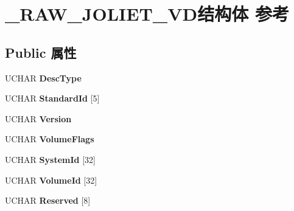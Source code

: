 \hypertarget{struct___r_a_w___j_o_l_i_e_t___v_d}{}\section{\+\_\+\+R\+A\+W\+\_\+\+J\+O\+L\+I\+E\+T\+\_\+\+V\+D结构体 参考}
\label{struct___r_a_w___j_o_l_i_e_t___v_d}
\subsection*{Public 属性}
\begin{DoxyCompactItemize}
\item 
\mbox{\label{struct___r_a_w___j_o_l_i_e_t___v_d_a44002d51a029bf042987a803df643923}} 
U\+C\+H\+AR {\bfseries Desc\+Type}
\item 
\mbox{\label{struct___r_a_w___j_o_l_i_e_t___v_d_ae21f5d4b1b666ac4437ecc6f81cd67c8}} 
U\+C\+H\+AR {\bfseries Standard\+Id} \mbox{[}5\mbox{]}
\item 
\mbox{\label{struct___r_a_w___j_o_l_i_e_t___v_d_a327730e97eef9039cc99c5e3c95f2bbf}} 
U\+C\+H\+AR {\bfseries Version}
\item 
\mbox{\label{struct___r_a_w___j_o_l_i_e_t___v_d_aaf3effbcfba6edf7d45d1fcbaa0779d8}} 
U\+C\+H\+AR {\bfseries Volume\+Flags}
\item 
\mbox{\label{struct___r_a_w___j_o_l_i_e_t___v_d_ae65850ccbd1268ed052f437f28adff53}} 
U\+C\+H\+AR {\bfseries System\+Id} \mbox{[}32\mbox{]}
\item 
\mbox{\label{struct___r_a_w___j_o_l_i_e_t___v_d_a3bc6aa9b651ae4202aaecd7222ba156b}} 
U\+C\+H\+AR {\bfseries Volume\+Id} \mbox{[}32\mbox{]}
\item 
\mbox{\label{struct___r_a_w___j_o_l_i_e_t___v_d_a246fd7e5a1f12614b5c0cd8ea650f605}} 
U\+C\+H\+AR {\bfseries Reserved} \mbox{[}8\mbox{]}
\item 
\mbox{\label{struct___r_a_w___j_o_l_i_e_t___v_d_acfb1edf163eb14fc032674cf36c75b03}} 

\end{DoxyCompactItemize}
